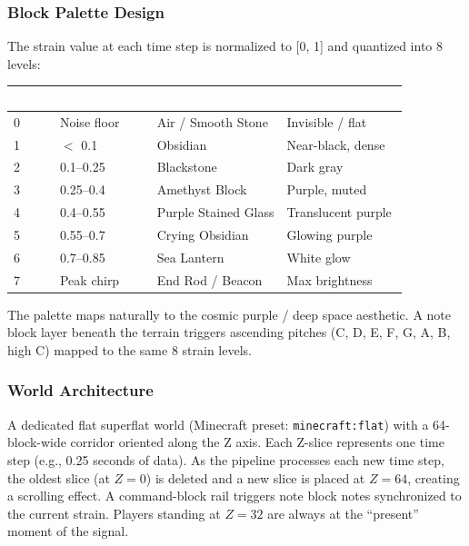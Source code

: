 \documentclass[11pt,letterpaper]{article}
\newcommand{\tableheader}[1]{\textbf{\sffamily\textcolor{white}{#1}}}
\begin{document}
\subsubsection{Block Palette Design}

The strain value at each time step is normalized to [0, 1] and quantized into 8 levels:

\begin{center}
\begin{tabularx}{\textwidth}{C{1.5cm}L{3cm}L{4cm}X}
\toprule
{}
\tableheader{Level} & \tableheader{Strain Range} & \tableheader{Block} & \tableheader{Visual Character} \\
 & Noise floor & Air / Smooth Stone & Invisible / flat \\
1 & $<$ 0.1 & Obsidian & Near-black, dense \\
2 & 0.1--0.25 & Blackstone & Dark gray \\
3 & 0.25--0.4 & Amethyst Block & Purple, muted \\
4 & 0.4--0.55 & Purple Stained Glass & Translucent purple \\
5 & 0.55--0.7 & Crying Obsidian & Glowing purple \\
6 & 0.7--0.85 & Sea Lantern & White glow \\
7 & Peak chirp & End Rod / Beacon & Max brightness \\
\bottomrule
\end{tabularx}
\end{center}

The palette maps naturally to the cosmic purple / deep space aesthetic. A note block layer beneath the terrain triggers ascending pitches (C, D, E, F, G, A, B, high C) mapped to the same 8 strain levels.

\subsubsection{World Architecture}

A dedicated flat superflat world (Minecraft preset: \texttt{minecraft:flat}) with a 64-block-wide corridor oriented along the Z axis. Each Z-slice represents one time step (e.g., 0.25 seconds of data). As the pipeline processes each new time step, the oldest slice (at $Z=0$) is deleted and a new slice is placed at $Z=64$, creating a scrolling effect. A command-block rail triggers note block notes synchronized to the current strain. Players standing at $Z=32$ are always at the ``present'' moment of the signal.
\end{document}
